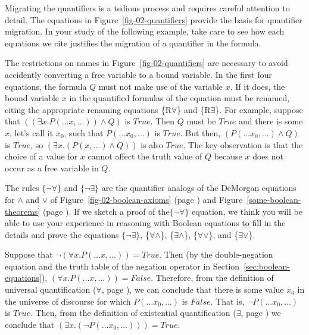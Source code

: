 {{Migrating the quantifiers is a tedious process and requires
careful attention to detail.
The equations in Figure~\ref{fig-02-quantifiers}
provide the basis for quantifier migration.
In your study of the following example,
take care to see how each equations we cite justifies
the migration of a quantifier in the formula.

The restrictions on names in Figure~\ref{fig-02-quantifiers} are necessary to avoid
accidently converting a free variable to a bound variable.
In the first four equations, the formula $Q$ must not make use of the variable $x$.
If it does, the bound variable $x$ in the quantified formulas of the equation
must be renamed, citing the appropriate renaming equations \{R$\forall$\} and \{R$\exists$\}.
For example,
suppose that $((\exists x.P(\dots x, \dots)) \wedge Q)$ is $True$.
Then $Q$ must be $True$ and there is
some $x$, let's call it $x_0$, such that $P(\dots x_0, \dots)$ is $True$.
But then, $(P(\dots x_0,\dots) \wedge Q)$
is $True$, so $(\exists x.(P(x, \dots) \wedge Q))$ is also $True$.
The key observation is that the choice of a value for $x$
cannot affect the truth value of $Q$ because $x$ does
not occur as a free variable in $Q$.

\label{why-neg-forall}
The rules $\{\neg\forall\}$ and $\{\neg\exists\}$
are the quantifier analogs of the DeMorgan equations for $\wedge$ and $\vee$
of Figure~\ref{fig-02-boolean-axioms} (page \pageref{fig-02-boolean-axioms})
and Figure~\ref{some-boolean-theorems} (page \pageref{some-boolean-theorems}).
If we sketch a proof of the$\{\neg\forall\}$ equation, we think you will be able
to use your experience in reasoning with Boolean equations to fill in the details
and prove the equations $\{\neg\exists\}$, \{$\forall\wedge$\},
\{$\exists\wedge$\}, \{$\forall\vee$\}, and \{$\exists\vee$\}.

Suppose that $\neg(\forall x.P(\dots x, \dots)) = True$.
Then (by the double-negation equation and the truth table of the negation operator
in Section~\ref{sec:boolean-equations}),  $(\forall x.P(\dots x, \dots)) = False$.
Therefore, from the definition of universal quantification
($\forall$, page \pageref{def:universal-quantifier}),
we can conclude that there is some value $x_0$ in the universe of discourse for which
$P(\dots x_0, \dots)$ is $False$. That is, $\neg P(\dots x_0, \dots)$ is $True$.
Then, from the definition of existential quantification
($\exists$, page \pageref{def:existential-quantifier})
we conclude that $(\exists x.(\neg P(\dots x_0, \dots))) = True$.

}}
